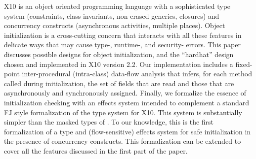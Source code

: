 X10 is an object oriented programming language with a sophisticated
    type system (constraints, class invariants, non-erased generics, closures)
    and concurrency constructs (asynchronous activities, multiple places).
Object initialization is a cross-cutting concern that interacts with all these features
    in delicate ways that may cause type-, runtime-, and security- errors.
This paper discusses possible designs for object initialization,
    and the ``hardhat'' design chosen and implemented in X10 version 2.2.
Our implementation includes a
    fixed-point inter-procedural (intra-class)
    data-flow analysis
    that infers, for each method called during initialization,
    the set of fields that are read and
    those that are asynchronously and synchronously assigned.
Finally, we formalize the essence of initialization checking with an
effects system intended to complement a standard FJ style
formalization of the type system for X10. This system is substantially
simpler than the masked types of \cite{XinQi:2009}. To our knowledge, this is
the first formalization of a type and (flow-sensitive) effects system
for safe initialization in the presence of concurrency
constructs. This formalization can be extended to cover all the
features discussed in the first part of the paper.
